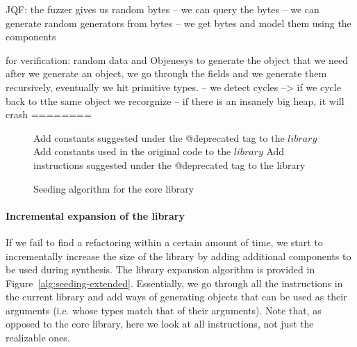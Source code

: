 \documentclass[runningheads,a4paper]{llncs}
\begin{document}
JQF:
the fuzzer gives us random bytes
-- we can query the bytes
-- we can generate random generators from bytes
-- we get bytes and model them using the components

for verification: random data and Objenesys to generate the object that we need
after we generate an object, we go through the fields and we generate them recursively,
eventually we hit primitive types.
-- we detect cycles --> if we cycle back to tthe same object we recorgnize
-- if there is an insanely big heap, it will crash
========



\begin{figure}
\begin{algorithm}[H]
\SetAlgoLined
{}
 Add constants suggested under the @deprecated tag to the $library$\;
 Add constants used in the original code to the $library$\;
 Add instructions suggested under the @deprecated tag to the library\;
\end{algorithm}
 \caption{Seeding algorithm for the core library}
\label{alg:seeding-core}
\end{figure}

\paragraph{Incremental expansion of the library}
If we fail to find a refactoring within a certain amount of time,
we start to incrementally increase the size of the library by adding additional components to be used during synthesis.
The library expansion algorithm is provided in Figure~\ref{alg:seeding-extended}.
Essentially, we go through all the instructions in the current library and add
ways of generating objects that can be used as their arguments (i.e. whose types match that of their arguments).
Note that, as opposed to the core library, here we look at all instructions, not just the realizable ones.
\end{document}
